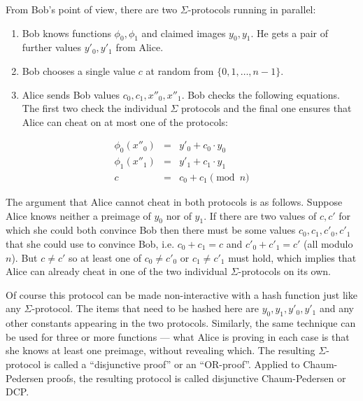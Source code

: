 \documentclass[envcountsame]{llncs}
\begin{document}
From Bob's point of view, there are two $\Sigma$-protocols running in
parallel:
\begin{enumerate}
\item Bob knows functions $\phi_0, \phi_1$ and claimed images
$y_0, y_1$. He gets a pair of further values $y'_0, y'_1$ from Alice.
\item Bob chooses a single value $c$ at random from $\{0, 1, \ldots, n-1\}$.
\item Alice sends Bob values $c_0, c_1, x''_0, x''_1$. Bob checks the following
equations. The first two check the individual $\Sigma$ protocols and the final
one ensures that Alice can cheat on at most one of the protocols:
\end{enumerate}
\begin{eqnarray}
\phi_0(x''_0) & = & y'_0 + c_0 \cdot y_0 \\
\phi_1(x''_1) & = & y'_1 + c_1 \cdot y_1 \\
c & = & c_0 + c_1 \pmod{n}
\end{eqnarray}

The argument that Alice cannot cheat in both protocols is as follows. Suppose
Alice knows neither a preimage of $y_0$ nor of $y_1$. If there are two values
of $c, c'$ for which she could both convince Bob then there must be some values
$c_0, c_1, c'_0, c'_1$ that she could use to convince Bob, i.e. $c_0 + c_1 = c$
and $c'_0 + c'_1 = c'$ (all modulo $n$). But $c \neq c'$ so at least one of
$c_0 \neq c'_0$ or $c_1 \neq c'_1$ must hold, which implies that Alice can
already cheat in one of the two individual $\Sigma$-protocols on its own.

Of course this protocol can be made non-interactive with a hash function just
like any $\Sigma$-protocol. The items that need to be hashed here are $y_0, y_1,
y'_0, y'_1$ and any other constants appearing in the two protocols. Similarly,
the same technique can be used for three or more functions --- what Alice is
proving in each case is that she knows at least one preimage, without revealing
which. The resulting $\Sigma$-protocol is called a ``disjunctive proof'' or an
``OR-proof''. Applied to Chaum-Pedersen proofs, the resulting protocol is called
disjunctive Chaum-Pedersen or DCP.
\end{document}
